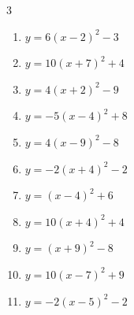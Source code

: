 \begin{multicols}{3}
\begin{enumerate}
        \phantom{$\displaystyle 頂点\left( -4 , -5 \right)$}

  \item $\displaystyle y=6\left( x-2\right)^{2}-3$

        \phantom{$\displaystyle 頂点\left( 2 , -3 \right)$}

  \item $\displaystyle y=10\left( x+7\right)^{2}+4$

        \phantom{$\displaystyle 頂点\left( -7 , 4 \right)$}

  \item $\displaystyle y=4\left( x+2\right)^{2}-9$

        \phantom{$\displaystyle 頂点\left( -2 , -9 \right)$}

  \item $\displaystyle y=-5\left( x-4\right)^{2}+8$

        \phantom{$\displaystyle 頂点\left( 4 , 8 \right)$}

  \item $\displaystyle y=4\left( x-9\right)^{2}-8$

        \phantom{$\displaystyle 頂点\left( 9 , -8 \right)$}

  \item $\displaystyle y=-2\left( x+4\right)^{2}-2$

        \phantom{$\displaystyle 頂点\left( -4 , -2 \right)$}

  \item $\displaystyle y=\left( x-4\right)^{2}+6$

        \phantom{$\displaystyle 頂点\left( 4 , 6 \right)$}

\columnbreak %

\resetques

  \item $\displaystyle y=10\left( x+4\right)^{2}+4$

        \phantom{$\displaystyle 頂点\left( -4 , 4 \right)$}

  \item $\displaystyle y=\left( x+9\right)^{2}-8$

        \phantom{$\displaystyle 頂点\left( -9 , -8 \right)$}

  \item $\displaystyle y=10\left( x-7\right)^{2}+9$

        \phantom{$\displaystyle 頂点\left( 7 , 9 \right)$}

  \item $\displaystyle y=-2\left( x-5\right)^{2}-2$


\end{enumerate}
\end{multicols}
